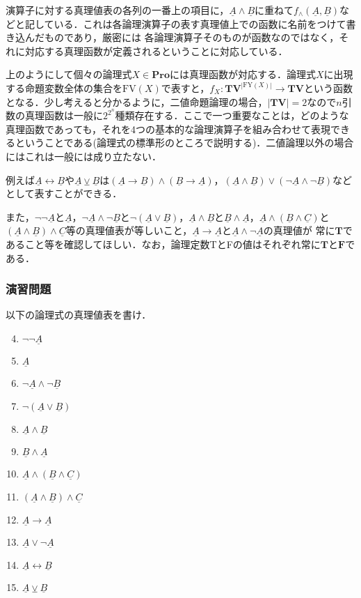 \documentclass{ltjsarticle}
\theoremstyle{mystyle1}
\theoremstyle{mystyle3}
\theoremstyle{mystyle2}
\newcommand{\uA}{\underline{A}}
\newcommand{\uB}{\underline{B}}
\newcommand{\uC}{\underline{C}}
\newcommand{\bT}{\ensuremath{\mathbf{T}}}
\newcommand{\bF}{\ensuremath{\mathbf{F}}}
\newcommand{\bV}{\ensuremath{\mathbf{V}}}
\newcommand{\bPro}{\ensuremath{\mathbf{Pro}}}
\newcommand{\red}[1]{{\color{red} #1}}
\begin{document}
演算子に対する真理値表の各列の一番上の項目に，$\uA\wedge\uB$に重ねて$f_\wedge\left(\uA,\uB\right)$などと記している．これは各論理演算子の表す真理値上での函数に名前をつけて書き込んだものであり，厳密には\red{各論理演算子そのものが函数なのではなく，それに対応する真理函数が定義される}ということに対応している．

上のようにして個々の論理式$X\in\bPro$には真理函数が対応する．論理式$X$に出現する命題変数全体の集合を$\mathrm{FV}\left(X\right)$で表すと，$f_X : \bT\bV^{|\textrm{FY}\left(X\right)|}\to\bT\bV$という函数となる．少し考えると分かるように，二値命題論理の場合，$|\bT\bV| = 2$なので$n$引数の真理函数は一般に$2^{2^n}$種類存在する．ここで一つ重要なことは，どのような真理函数であっても，それを4つの基本的な論理演算子を組み合わせて表現できるということである(論理式の標準形のところで説明する)．二値論理以外の場合にはこれは一般には成り立たない．

例えば$\uA\leftrightarrow\uB$や$\uA\veebar\uB$は$\left(\uA\to\uB\right)\wedge\left(\uB\to\uA\right)$，$\left(\uA\wedge\uB\right)\vee\left(\neg\uA\wedge\neg\uB\right)$などとして表すことができる．

また，$\neg\neg\uA$と$\uA$，$\neg\uA\wedge\neg\uB$と$\neg\left(\uA\vee\uB\right)$，$\uA\wedge\uB$と$\uB\wedge\uA$，$\uA\wedge\left(\uB\wedge\uC\right)$と$\left(\uA\wedge\uB\right)\wedge\uC$等の真理値表が等しいこと，$\uA\to\uA$と$\uA\wedge\neg\uA$の真理値が 常に$\bT$であること等を確認してほしい．なお，論理定数TとFの値はそれぞれ常に$\bT$と$\bF$である．
\subsubsection*{演習問題}
以下の論理式の真理値表を書け．
\begin{enumerate}
  \setcounter{enumi}{3}
  \item $\neg\neg\uA$
  \item $\uA$
  \item $\neg\uA\wedge\neg\uB$
  \item $\neg\left(\uA\vee\uB\right)$
  \item $\uA\wedge\uB$
  \item $\uB\wedge\uA$
  \item $\uA\wedge\left(\uB\wedge\uC\right)$
  \item $\left(\uA\wedge\uB\right)\wedge\uC$
  \item $\uA\to\uA$
  \item $\uA\vee\neg\uA$
  \item $\uA\leftrightarrow\uB$
  \item $\uA\veebar\uB$
\end{enumerate}
\end{document}
